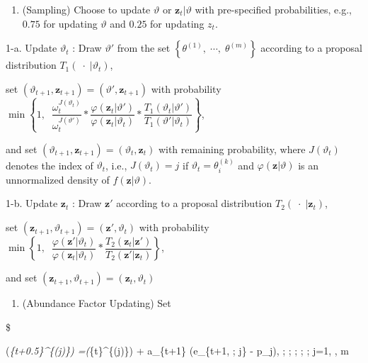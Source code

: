 \documentclass[
]{book}
\providecommand{\tightlist}{%
  \setlength{\itemsep}{0pt}\setlength{\parskip}{0pt}}
\begin{document}
\begin{enumerate}
\def\labelenumi{\arabic{enumi}.}
\tightlist
\item
  (Sampling) Choose to update \(\vartheta\) or \(\pmb z_t \vert \vartheta\) with pre-specified probabilities, e.g., \(0.75\) for updating \(\vartheta\) and \(0.25\) for updating \(z_t\).
\end{enumerate}

1-a. Update \(\vartheta_{t}\) : Draw \(\vartheta '\) from the set \(\left \{ \theta^{(1)}, \; \cdots, \; \theta^{(m)} \right \}\) according to a proposal distribution \(T_1 ( \; \cdot \; \vert \vartheta_{t})\),

set \((\vartheta_{t+1}, \pmb z_{t+1}) = (\vartheta ' , \pmb z_{t+1} )\) with probability \(\min \left\{ 1, \; \; \dfrac{\omega_t^{J(\vartheta_t)}}{\omega_t^{J(\vartheta ')}} \ast \dfrac {\varphi (\pmb z_{t} \vert \vartheta ')} {\varphi (\pmb z_{t} \vert \vartheta_{t})} \ast \dfrac{T_1 (\vartheta_{t} \vert \vartheta ' )}{T_1 (\vartheta ' \vert \vartheta_{t} )} \right\}\),

and set \((\vartheta_{t+1}, \pmb z_{t+1}) = (\vartheta_{t}, \pmb z_t)\) with remaining probability, where \(J(\vartheta_t)\) denotes the index of \(\vartheta_t\), i.e., \(J(\vartheta_t) = j\) if \(\vartheta_t = \theta_i^{(k)}\) and \(\varphi(\pmb z \vert \vartheta)\) is an unnormalized density of \(f(\pmb z \vert \vartheta)\).

1-b. Update \(\pmb z_t\) : Draw \(\pmb z '\) according to a proposal distribution \(T_2 ( \; \cdot \; \vert \pmb z_t)\),

set \((\pmb z_{t+1} , \vartheta_{t+1}) = (\pmb z ' , \vartheta_{t})\) with probability \(\min \left\{ 1, \; \; \dfrac {\varphi (\pmb z ' \vert \vartheta_{t})} {\varphi (\pmb z_{t} \vert \vartheta_{t})} \ast \dfrac{T_2 (\pmb z_{t} \vert \pmb z ' )}{T_2 (\pmb z ' \vert \pmb z_{t} )} \right\}\),

and set \((\pmb z_{t+1} , \vartheta_{t+1}) = (\pmb z_t , \vartheta_{t})\)

\begin{enumerate}
\def\labelenumi{\arabic{enumi}.}
\setcounter{enumi}{1}
\tightlist
\item
  (Abundance Factor Updating) Set
\end{enumerate}

\$

\log (\omega\emph{\{t+0.5\}\^{}\{(j)\}) =\log (\omega}\{t\}\^{}\{(j)\}) + a\_\{t+1\} (e\_\{t+1, ; j\} - p\_j), ; ; ; ; ; j=1, \cdots, m
\end{document}
